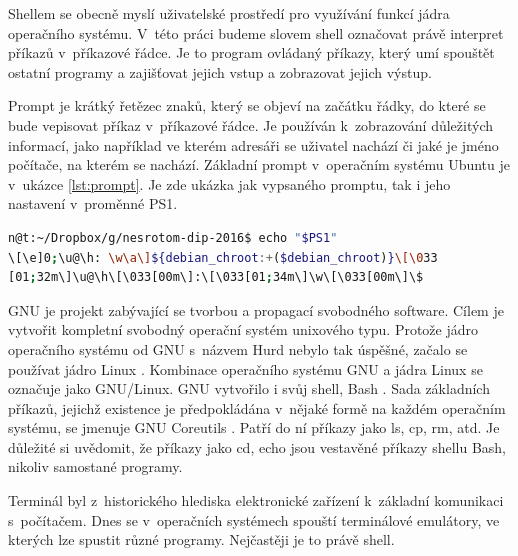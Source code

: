 \documentclass[thesis=M,czech]{FITthesis}[2012/06/26]
\begin{document}
Shellem se obecně myslí uživatelské prostředí pro využívání funkcí jádra operačního systému. V~této práci budeme slovem shell označovat právě interpret příkazů v~příkazové řádce. Je to program ovládaný příkazy, který umí spouštět ostatní programy a zajišťovat jejich vstup a zobrazovat jejich výstup.


Prompt je krátký řetězec znaků, který se objeví na začátku řádky, do které se bude vepisovat příkaz v~příkazové řádce. Je používán k~zobrazování důležitých informací, jako například ve kterém adresáři se uživatel nachází či jaké je jméno počítače, na kterém se nachází. Základní prompt v~operačním systému Ubuntu \cite{ubuntu} je v~ukázce \ref{lst:prompt}. Je zde ukázka jak vypsaného promptu, tak i jeho nastavení v~proměnné PS1.

\noindent
\begin{minipage}{\linewidth}
\begin{lstlisting}[language=bash, caption={Prompt v~shellu}, label={lst:prompt}]
n@t:~/Dropbox/g/nesrotom-dip-2016$ echo "$PS1"
\[\e]0;\u@\h: \w\a\]${debian_chroot:+($debian_chroot)}\[\033
[01;32m\]\u@\h\[\033[00m\]:\[\033[01;34m\]\w\[\033[00m\]\$
\end{lstlisting}
\end{minipage}



GNU \cite{gnu} je projekt zabývající se tvorbou a propagací svobodného software. Cílem je vytvořit kompletní svobodný operační systém unixového typu. Protože jádro operačního systému od GNU s~názvem Hurd \cite{hurd} nebylo tak úspěšné, začalo se používat jádro Linux \cite{linuxkernel}. Kombinace operačního systému GNU a jádra Linux se označuje jako GNU/Linux. GNU vytvořilo i svůj shell, Bash \cite{bash}. Sada základních příkazů, jejichž existence je předpokládána v~nějaké formě na každém operačním systému, se jmenuje GNU Coreutils \cite{coreutils}. Patří do ní příkazy jako ls, cp, rm, atd. Je důležité si uvědomit, že příkazy jako cd, echo jsou vestavěné příkazy shellu Bash, nikoliv samostané programy.


Terminál byl z~historického hlediska elektronické zařízení k~základní komunikaci s~počítačem. Dnes se v~operačních systémech spouští terminálové emulátory, ve kterých lze spustit různé programy. Nejčastěji je to právě shell.
\end{document}

